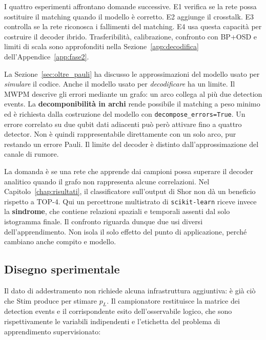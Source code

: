 \ifdecoderbody

I quattro esperimenti affrontano domande successive. E1 verifica se la rete possa sostituire il matching quando il modello è corretto. E2 aggiunge il crosstalk. E3 controlla se la rete riconosca i fallimenti del matching. E4 usa questa capacità per costruire il decoder ibrido. Trasferibilità, calibrazione, confronto con BP+OSD e limiti di scala sono approfonditi nella Sezione~\ref{app:decodifica} dell'Appendice~\ref{app:fase2}.

La Sezione~\ref{sec:oltre_pauli} ha discusso le approssimazioni del modello usato per \emph{simulare} il codice. Anche il modello usato per \emph{decodificare} ha un limite. Il \ac{MWPM} descrive gli errori mediante un grafo: un arco collega al più due detection events. La \textbf{decomponibilità in archi} rende possibile il matching a peso minimo ed è richiesta dalla costruzione del modello con \texttt{decompose\_errors=True}. Un errore correlato su due qubit dati adiacenti può però attivare fino a quattro detector. Non è quindi rappresentabile direttamente con un solo arco, pur restando un errore Pauli. Il limite del decoder è distinto dall'approssimazione del canale di rumore.

La domanda è se una rete che apprende dai campioni possa superare il decoder analitico quando il grafo non rappresenta alcune correlazioni. Nel Capitolo~\ref{chap:risultati}, il classificatore sull'output di Shor non dà un beneficio rispetto a TOP-4. Qui un percettrone multistrato di \texttt{scikit-learn} riceve invece la \textbf{sindrome}, che contiene relazioni spaziali e temporali assenti dal solo istogramma finale. Il confronto riguarda dunque due usi diversi dell'apprendimento. Non isola il solo effetto del punto di applicazione, perché cambiano anche compito e modello.

\subsection{Disegno sperimentale}
\label{subsec:neural_disegno}

Il dato di addestramento non richiede alcuna infrastruttura aggiuntiva: è già ciò che Stim produce per stimare $p_L$. Il campionatore restituisce la matrice dei detection events e il corrispondente esito dell'osservabile logico, che sono rispettivamente le variabili indipendenti e l'etichetta del problema di apprendimento supervisionato:

